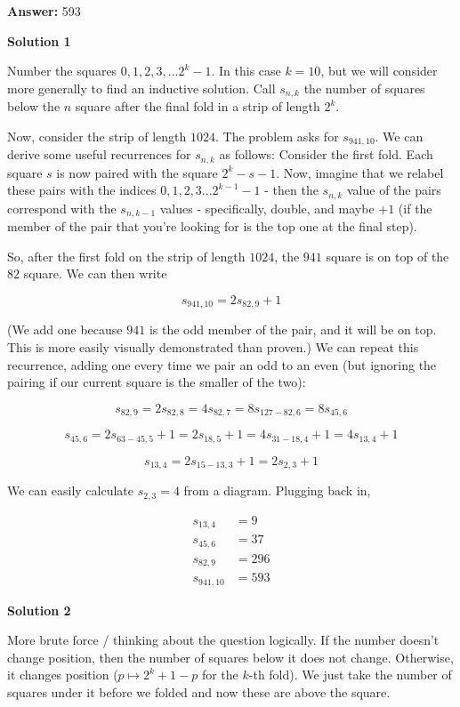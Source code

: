 \begin{enumerate}
 
 \textbf{Answer: }593



\textbf{Solution 1}

Number the squares $0, 1, 2, 3, ... 2^{k} - 1$.  In this case $k = 10$, but we will consider more generally to find an inductive solution.  Call $s_{n, k}$ the number of squares below the $n$ square after the final fold in a strip of length $2^{k}$.

 Now, consider the strip of length $1024$.  The problem asks for $s_{941, 10}$.  We can derive some useful recurrences for $s_{n, k}$ as follows:  Consider the first fold.  Each square $s$ is now paired with the square $2^{k} - s - 1$.  Now, imagine that we relabel these pairs with the indices $0, 1, 2, 3... 2^{k - 1} - 1$ - then the $s_{n, k}$ value of the pairs correspond with the $s_{n, k - 1}$ values - specifically, double, and maybe $+ 1$ (if the member of the pair that you're looking for is the top one at the final step).

 So, after the first fold on the strip of length $1024$, the $941$ square is on top of the $82$ square.  We can then write

 
 \[s_{941, 10} = 2s_{82, 9} + 1\]

 (We add one because $941$ is the odd member of the pair, and it will be on top.  This is more easily visually demonstrated than proven.)  We can repeat this recurrence, adding one every time we pair an odd to an even (but ignoring the pairing if our current square is the smaller of the two):

 
 \[s_{82, 9} = 2s_{82, 8} = 4s_{82, 7} = 8s_{127 - 82, 6} = 8s_{45, 6}\]

 \[s_{45, 6} = 2s_{63 - 45, 5} + 1 = 2s_{18, 5} + 1 = 4s_{31 - 18, 4} + 1 = 4s_{13, 4} + 1\]

 \[s_{13, 4} = 2s_{15 - 13, 3} + 1 = 2s_{2, 3}+1\]

 We can easily calculate $s_{2, 3} = 4$ from a diagram.  Plugging back in,

 
 \begin{align*} s_{13, 4} &= 9 \\ s_{45, 6} &= 37 \\ s_{82, 9} &= 296 \\ s_{941, 10} &= \boxed{593}\end{align*}





\textbf{Solution 2}

More brute force / thinking about the question logically. If the number doesn't change position, then the number of squares below it does not change. Otherwise, it changes position ($p\mapsto 2^k+1-p$ for the $k$-th fold). We just take the number of squares under it before we folded and now these are above the square. 


\end{enumerate}
